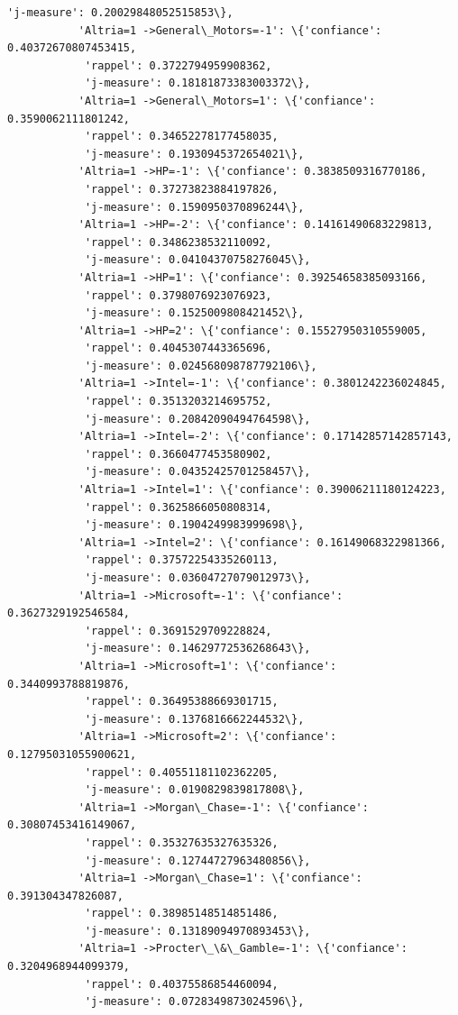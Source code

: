 \documentclass[11pt]{article}
\begin{document}
\begin{Verbatim}[commandchars=\\\{\}]
            'j-measure': 0.20029848052515853\},
           'Altria=1 ->General\_Motors=-1': \{'confiance': 0.40372670807453415,
            'rappel': 0.3722794959908362,
            'j-measure': 0.18181873383003372\},
           'Altria=1 ->General\_Motors=1': \{'confiance': 0.3590062111801242,
            'rappel': 0.34652278177458035,
            'j-measure': 0.1930945372654021\},
           'Altria=1 ->HP=-1': \{'confiance': 0.3838509316770186,
            'rappel': 0.37273823884197826,
            'j-measure': 0.1590950370896244\},
           'Altria=1 ->HP=-2': \{'confiance': 0.14161490683229813,
            'rappel': 0.3486238532110092,
            'j-measure': 0.04104370758276045\},
           'Altria=1 ->HP=1': \{'confiance': 0.39254658385093166,
            'rappel': 0.3798076923076923,
            'j-measure': 0.1525009808421452\},
           'Altria=1 ->HP=2': \{'confiance': 0.15527950310559005,
            'rappel': 0.4045307443365696,
            'j-measure': 0.024568098787792106\},
           'Altria=1 ->Intel=-1': \{'confiance': 0.3801242236024845,
            'rappel': 0.3513203214695752,
            'j-measure': 0.20842090494764598\},
           'Altria=1 ->Intel=-2': \{'confiance': 0.17142857142857143,
            'rappel': 0.3660477453580902,
            'j-measure': 0.04352425701258457\},
           'Altria=1 ->Intel=1': \{'confiance': 0.39006211180124223,
            'rappel': 0.3625866050808314,
            'j-measure': 0.1904249983999698\},
           'Altria=1 ->Intel=2': \{'confiance': 0.16149068322981366,
            'rappel': 0.37572254335260113,
            'j-measure': 0.03604727079012973\},
           'Altria=1 ->Microsoft=-1': \{'confiance': 0.3627329192546584,
            'rappel': 0.3691529709228824,
            'j-measure': 0.14629772536268643\},
           'Altria=1 ->Microsoft=1': \{'confiance': 0.3440993788819876,
            'rappel': 0.36495388669301715,
            'j-measure': 0.1376816662244532\},
           'Altria=1 ->Microsoft=2': \{'confiance': 0.12795031055900621,
            'rappel': 0.40551181102362205,
            'j-measure': 0.0190829839817808\},
           'Altria=1 ->Morgan\_Chase=-1': \{'confiance': 0.30807453416149067,
            'rappel': 0.35327635327635326,
            'j-measure': 0.12744727963480856\},
           'Altria=1 ->Morgan\_Chase=1': \{'confiance': 0.391304347826087,
            'rappel': 0.38985148514851486,
            'j-measure': 0.13189094970893453\},
           'Altria=1 ->Procter\_\&\_Gamble=-1': \{'confiance': 0.3204968944099379,
            'rappel': 0.40375586854460094,
            'j-measure': 0.0728349873024596\},

\end{Verbatim}
\end{document}
